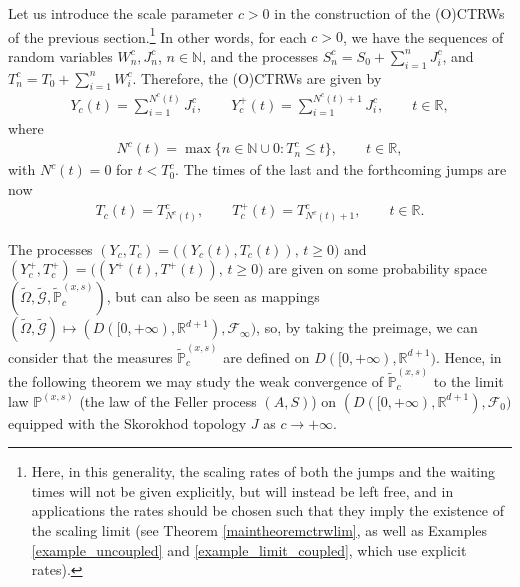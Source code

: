 \documentclass[reqno]{amsart}
\theoremstyle{remark}
\numberwithin{equation}{section} %
\newcommand{\RR}{\mathbb{R}}
\newcommand{\PP}{\mathds{P}}
\newcommand{\wt}{\widetilde}
\newcommand{\1}{\mathds{1}}
\begin{document}
	
	Let us introduce the scale parameter $c>0$ in the construction of the (O)CTRWs of the previous section.\footnote{Here, in this generality, the scaling rates of both the jumps and the waiting times will not be given explicitly, but will instead be left free, and in applications the rates should be chosen such that they imply the existence of the scaling limit (see Theorem \ref{maintheoremctrwlim}, as well as Examples \ref{example_uncoupled} and \ref{example_limit_coupled}, which use explicit rates).} In other words, for each $c>0$, we have the sequences of random variables $W_n^c, J_n^c$, $n \in \mathbb{N}$, and the processes $S_n^c = S_0 + \sum_{i=1}^n J_i^c$, and $T_n^c = T_0+ \sum_{i=1}^n W_i^c$. Therefore, the (O)CTRWs are given by
	\begin{align}
		Y_c(t) = \sum_{i=1}^{N^c(t)} J_i^c,  \qquad Y_c^+(t) = \sum_{i=1}^{N^c(t)+1} J_i^c,\qquad t\in \RR,
	\end{align}
	where
	\begin{align}
		N^c(t) = \max \{ n \in \mathbb{N} \cup 0 : T_n^c \leq t \},\qquad t\in \RR,
	\end{align}
	with $N^c(t)=0$ for $t<T_0^c$. The times of the last and the forthcoming jumps are now
	\begin{align}
		T_c(t) = T_{N^c(t)}^c,  \qquad T_c^+(t) = T_{N^c(t)+1}^c,\qquad t\in \RR.
	\end{align}
	
	
	
	The processes $(Y_c,T_c) = \big ((Y_c(t), T_c(t)), \, t \geq 0\big)$ and $(Y^+_c, T^+_c)=\big( (Y^+(t), T^+(t)), \, t \geq 0 \big)$ are given on some probability space $(\wt{\Omega}, \wt{\mathcal{G}}, \wt{\PP}_c^{(x,s)} )$, but can also be seen as mappings $( \wt{\Omega}, \wt{\mathcal{G}}) \mapsto (D([0, +\infty), \mathbb{R}^{d+1}), {\mathcal{F}_\infty})$, so, by taking the preimage, we can consider that the measures $\wt{\PP}_c^{(x,s)}$ are defined on $D([0, +\infty), \mathbb{R}^{d+1})$. Hence, in the following theorem we may study the weak convergence of $\wt{\PP}_c^{(x,s)}$ to the limit law $\PP^{(x,s)}$ (the law of the Feller process $(A,S)$) on $(D([0, +\infty), \mathbb{R}^{d+1}), \mathcal{F}_0 )$ equipped with the Skorokhod topology $J$ as $c\to +\infty$. 
	
	
	
\end{document}
